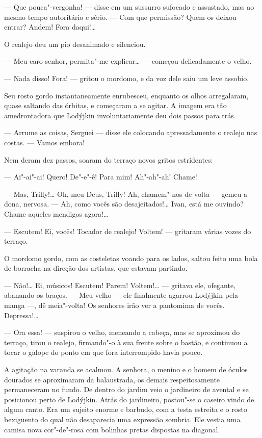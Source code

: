 --- Que pouca"-vergonha! --- disse em um sussurro sufocado e assustado,
mas ao mesmo tempo autoritário e sério. --- Com que permissão? Quem os
deixou entrar? Andem! Fora daqui!\ldots{}

O realejo deu um pio desanimado e silenciou.

--- Meu caro senhor, permita"-me explicar\ldots{} --- começou delicadamente o
velho.

--- Nada disso! Fora! --- gritou o mordomo, e da voz dele saiu um leve
assobio.

Seu rosto gordo instantaneamente enrubesceu, enquanto os olhos
arregalaram, quase saltando das órbitas, e começaram a se agitar. A
imagem era tão amedrontadora que Lodýjkin involuntariamente deu dois
passos para trás.

--- Arrume as coisas, Serguei --- disse ele colocando apressadamente o
realejo nas costas. --- Vamos embora!

Nem deram dez passos, soaram do terraço novos gritos estridentes:

--- Ai"-ai"-ai! Quero! De"-e"-ê! Para mim! Ah"-ah"-ah! Chame!

--- Mas, Trilly!\ldots{} Oh, meu Deus, Trilly! Ah, chamem"-nos de volta ---
gemeu a dona, nervosa. --- Ah, como vocês são desajeitados!\ldots{} Ivan,
está me ouvindo? Chame aqueles mendigos agora!\ldots{}

--- Escutem! Ei, vocês! Tocador de realejo! Voltem! --- gritaram várias
vozes do terraço.

O mordomo gordo, com as costeletas voando para os lados, saltou feito
uma bola de borracha na direção dos artistas, que estavam partindo.

--- Não!\ldots{} Ei, músicos! Escutem! Parem! Voltem!\ldots{} --- gritava ele,
ofegante, abanando os braços. --- Meu velho --- ele finalmente agarrou
Lodýjkin pela manga ---, dê meia"-volta! Os senhores irão ver a pantomima
de vocês. Depressa!\ldots{}

--- Ora essa! --- suspirou o velho, meneando a cabeça, mas se aproximou
do terraço, tirou o realejo, firmando"-o à sua frente sobre o bastão, e
continuou a tocar o galope do ponto em que fora interrompido havia
pouco.

A agitação na varanda se acalmou. A senhora, o menino e o homem de
óculos dourados se aproximaram da balaustrada, os demais respeitosamente
permaneceram no fundo. De dentro do jardim veio o jardineiro de avental
e se posicionou perto de Lodýjkin. Atrás do jardineiro, postou"-se o
caseiro vindo de algum canto. Era um sujeito enorme e barbudo, com a
testa estreita e o rosto bexiguento do qual não desaparecia uma expressão
sombria. Ele vestia uma camisa nova cor"-de"-rosa com bolinhas pretas
dispostas na diagonal.


